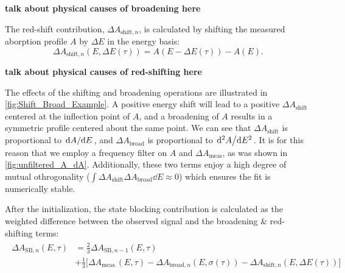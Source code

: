 \textbf{talk about physical causes of broadening here}

The red-shift contribution, $\Delta A_{\textrm{shift},n}$, is calculated by shifting the measured aborption profile $A$ by $\Delta E$ in the energy basis:
\begin{equation}
\Delta A_{\textrm{shift},n}(E, \Delta E(\tau)) = A(E- \Delta E(\tau)) - A(E).
\label{eqn:dA_Shift}
\end{equation}

\textbf{talk about physical causes of red-shifting here}

The effects of the shifting and broadening operations are illustrated in \cref{fig:Shift_Broad_Example}. A positive energy shift will lead to a positive $\Delta A_{\textrm{shift}}$ centered at the inflection point of $A$, and a broadening of $A$ results in a symmetric profile centered about the same point. We can see that $\Delta A_{\textrm{shift}}$ is proportional to $\dv*{A}{E}$, and $\Delta A_{\textrm{broad}}$ is proportional to $\dv*[2]{A}{E}$. It is for this reason that we employ a frequency filter on $A$ and $\Delta A_{\textrm{meas}}$, as was shown in \cref{fig:unfiltered_A_dA}. Additionally, these two terms enjoy a high degree of mutual othrogonality ($\int \Delta A_{\textrm{shift}} \Delta A_{\textrm{broad}} \dd{E} \approx 0$) which ensures the fit is numerically stable.

After the initialization, the state blocking contribution is calculated as the weighted difference between the observed signal and the broadening \& red-shifting terms:
\begin{align}
\begin{split}
\Delta A_{\textrm{SB},n}(E,\tau) &= \frac{2}{3} \Delta A_{\textrm{SB},n-1}(E,\tau) \\
&+ \frac{1}{3} \Big[ \Delta A_{\textrm{meas.}}(E,\tau) - \Delta A_{\textrm{broad},n}(E, \sigma(\tau))- \Delta A_{\textrm{shift},n}(E,\Delta E(\tau)) \Big]
\end{split}
\end{align}

